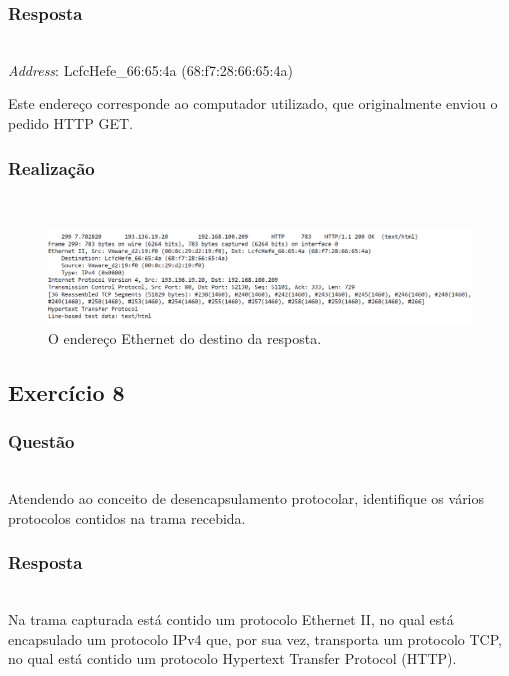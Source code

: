 \documentclass{llncs}
\begin{document}
\subsubsection{Resposta}\rule[-10pt]{0pt}{10pt}\\

\textit{Address}: LcfcHefe\_66:65:4a (68:f7:28:66:65:4a)

Este endereço corresponde ao computador utilizado, que originalmente enviou o pedido HTTP GET.

\subsubsection{Realização}\rule[-10pt]{0pt}{10pt}\\

\begin{figure}
  \begin{center}
  \includegraphics[scale=0.35]{imagens/HTTPresponse.png} 
  \end{center}
  \caption{O endereço Ethernet do destino da resposta.}
  \label{fig:ethernet_response_dest}
\end{figure}

\clearpage
\subsection{Exercício 8}
\subsubsection{Questão}\rule[-10pt]{0pt}{10pt}\\

Atendendo ao conceito de desencapsulamento protocolar, identifique os vários protocolos contidos na trama recebida.

\subsubsection{Resposta}\rule[-10pt]{0pt}{10pt}\\

Na trama capturada está contido um protocolo Ethernet II, no qual está encapsulado um protocolo IPv4 que, por sua vez, transporta um protocolo TCP, no qual está contido um protocolo Hypertext Transfer Protocol (HTTP).
\end{document}
